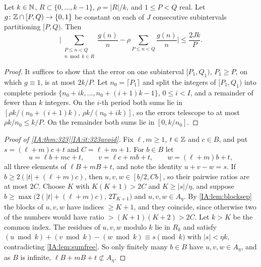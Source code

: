 \begin{lemma}\label{IA:lem:perblock}
Let $k\in\mathbb{N}$, $R\subset\{0,\dots,k-1\}$, $\rho=|R|/k$, and $1\le P<Q$ real. Let
$g\colon\mathbb{Z}\cap[P,Q)\to\{0,1\}$ be constant on each of $J$ consecutive subintervals partitioning
$[P,Q)$. Then
\[
\Big|\sum_{\substack{P\le n<Q\\ n\bmod k\in R}}\frac{g(n)}n-\rho\sum_{P\le n<Q}\frac{g(n)}n\Big|\le\frac{2Jk}P .
\]
\end{lemma}

\begin{proof}
It suffices to show that the error on one subinterval $[P_1,Q_1)$, $P_1\ge P$, on which $g\equiv1$,
is at most $2k/P$. Let $n_0=\lceil P_1\rceil$ and split the integers of $[P_1,Q_1)$ into complete
periods $\{n_0+ik,\dots,n_0+(i+1)k-1\}$, $0\le i<I$, and a remainder of fewer than $k$ integers. On
the $i$-th period both sums lie in $[\rho k/(n_0+(i+1)k),\,\rho k/(n_0+ik)]$, so the errors telescope
to at most $\rho k/n_0\le k/P$. On the remainder both sums lie in $[0,k/n_0]$.
\end{proof}

\begin{proof}[Proof of \cref{IA:thm:323}\ref{IA:it:323avoid}]
Fix $\ell,m\ge1$, $t\in\mathbb{Z}$ and $c\in B$, and put $s=(\ell+m)c+t$ and $C=\ell+m+1$. For $b\in B$ let
\[
u=\ell b+mc+t,\qquad v=\ell c+mb+t,\qquad w=(\ell+m)b+t,
\]
all three elements of $\ell B+mB+t$, and note the identity $u+v-w=s$. If
$b\ge2(|t|+(\ell+m)c)$, then $u,v,w\in[b/2,Cb]$, so their pairwise ratios are at most $2C$. Choose
$K$ with $K(K+1)>2C$ and $K\ge|s|/\eta$, and suppose $b\ge\max\big(2(|t|+(\ell+m)c),\,2T_{K+1}\big)$ and
$u,v,w\in A_\eta$. By \cref{IA:lem:blocksep} the blocks of $u,v,w$ have indices $\ge K+1$, and they
coincide, since otherwise two of the numbers would have ratio $>(K+1)(K+2)>2C$. Let $k>K$ be the common
index. The residues of $u,v,w$ modulo $k$ lie in $R_k$ and satisfy $(u\bmod k)+(v\bmod k)-(w\bmod k)
\equiv s\pmod k$ with $|s|<\eta k$, contradicting \cref{IA:lem:sumfree}. So only finitely many $b\in B$
have $u,v,w\in A_\eta$, and as $B$ is infinite, $\ell B+mB+t\not\subset A_\eta$.
\end{proof}

